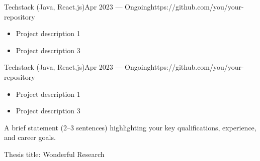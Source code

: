 \documentclass[10pt,a4paper,ragged2e,withhyper]{nextcv}
\begin{document}
\begin{paracol}{2}
{Techstack (Java, React.js)}{Apr 2023 --- Ongoing}{https://github.com/you/your-repository}
\begin{itemize}
  \item Project description 1
  \item Project description 3
\end{itemize}

\divider%

{Techstack (Java, React.js)}{Apr 2023 --- Ongoing}{https://github.com/you/your-repository}
\begin{itemize}
  \item Project description 1
  \item Project description 3
\end{itemize}

\switchcolumn%


A brief statement (2--3 sentences) highlighting your key qualifications, experience, and career goals.

\medskip



Thesis title: Wonderful Research

\divider%


\divider%


\medskip



\medskip%
\medskip%

\divider\smallskip

\\

\divider\smallskip


\end{paracol}
\end{document}
